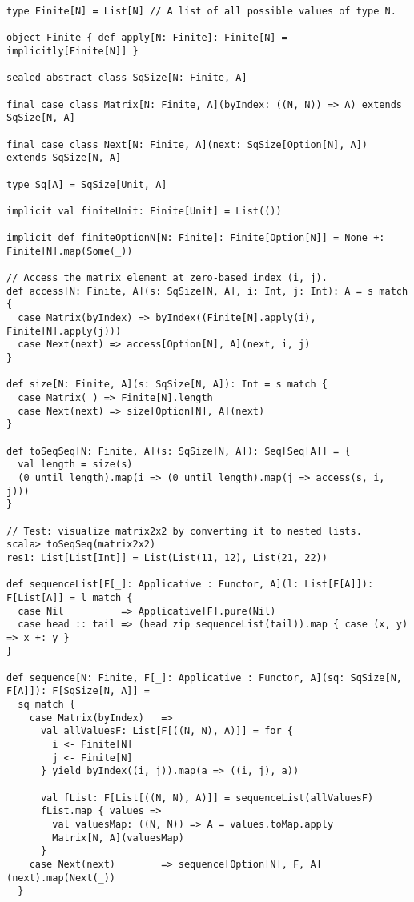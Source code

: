 \begin{lstlisting}[frame=single,fillcolor={\color{black}},framesep={0.2mm},framexleftmargin=2mm,framexrightmargin=2mm,framextopmargin=2mm,framexbottommargin=2mm]
type Finite[N] = List[N] // A list of all possible values of type N.

object Finite { def apply[N: Finite]: Finite[N] = implicitly[Finite[N]] }

sealed abstract class SqSize[N: Finite, A]

final case class Matrix[N: Finite, A](byIndex: ((N, N)) => A) extends SqSize[N, A]

final case class Next[N: Finite, A](next: SqSize[Option[N], A]) extends SqSize[N, A]

type Sq[A] = SqSize[Unit, A]

implicit val finiteUnit: Finite[Unit] = List(())

implicit def finiteOptionN[N: Finite]: Finite[Option[N]] = None +: Finite[N].map(Some(_))

// Access the matrix element at zero-based index (i, j).
def access[N: Finite, A](s: SqSize[N, A], i: Int, j: Int): A = s match {
  case Matrix(byIndex) => byIndex((Finite[N].apply(i), Finite[N].apply(j)))
  case Next(next) => access[Option[N], A](next, i, j)
}

def size[N: Finite, A](s: SqSize[N, A]): Int = s match {      
  case Matrix(_) => Finite[N].length
  case Next(next) => size[Option[N], A](next)
}

def toSeqSeq[N: Finite, A](s: SqSize[N, A]): Seq[Seq[A]] = {
  val length = size(s)
  (0 until length).map(i => (0 until length).map(j => access(s, i, j)))
} 

// Test: visualize matrix2x2 by converting it to nested lists.
scala> toSeqSeq(matrix2x2)
res1: List[List[Int]] = List(List(11, 12), List(21, 22))

def sequenceList[F[_]: Applicative : Functor, A](l: List[F[A]]): F[List[A]] = l match {
  case Nil          => Applicative[F].pure(Nil)
  case head :: tail => (head zip sequenceList(tail)).map { case (x, y) => x +: y }
}

def sequence[N: Finite, F[_]: Applicative : Functor, A](sq: SqSize[N, F[A]]): F[SqSize[N, A]] =
  sq match {
    case Matrix(byIndex)   =>
      val allValuesF: List[F[((N, N), A)]] = for {
        i <- Finite[N]
        j <- Finite[N]
      } yield byIndex((i, j)).map(a => ((i, j), a))

      val fList: F[List[((N, N), A)]] = sequenceList(allValuesF)
      fList.map { values =>
        val valuesMap: ((N, N)) => A = values.toMap.apply
        Matrix[N, A](valuesMap)
      }
    case Next(next)        => sequence[Option[N], F, A](next).map(Next(_))
  }
\end{lstlisting}

